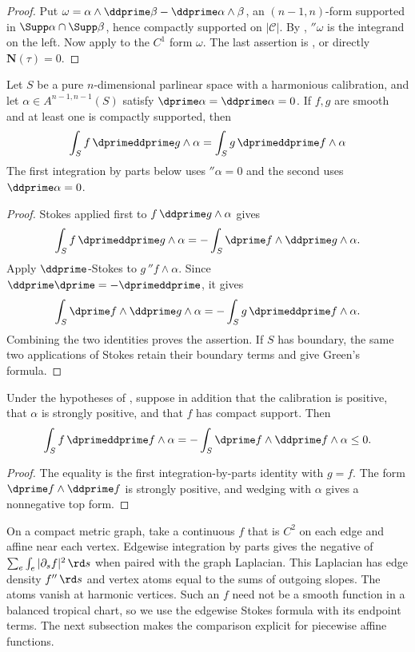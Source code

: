 \begin{proof}
Put $\omega=\alpha\wedge\ddprime\beta-\ddprime\alpha\wedge\beta$, an
$(n-1,n)$-form supported in $\Supp\alpha\cap\Supp\beta$, hence compactly
supported on $|\mathscr C|$.  By ,
$\dprime\omega$ is the integrand on the left.  Now apply
 to the $C^1$ form $\omega$.  The last
assertion is
, or directly $\mathbf N(\tau)=0$.
\end{proof}

\begin{corollary}
\label{cor:ch11-green-symmetry}
Let $S$ be a pure $n$-dimensional parlinear space with a harmonious
calibration, and let $\alpha\in A^{n-1,n-1}(S)$ satisfy
$\dprime\alpha=\ddprime\alpha=0$.  If $f,g$ are smooth and at least one is
compactly supported, then
\[
\int_S f\,\dprimeddprime g\wedge\alpha
=\int_S g\,\dprimeddprime f\wedge\alpha
\]
The first integration by parts below uses $\dprime\alpha=0$ and the second
uses $\ddprime\alpha=0$.
\end{corollary}
\begin{proof}
Stokes applied first to $f\,\ddprime g\wedge\alpha$ gives
\[
 \int_S f\,\dprimeddprime g\wedge\alpha
 =-\int_S \dprime f\wedge \ddprime g\wedge\alpha.
\]
Apply $\ddprime$-Stokes to $g\,\dprime f\wedge\alpha$.  Since
$\ddprime\dprime=-\dprimeddprime$, it gives
\[
 \int_S \dprime f\wedge \ddprime g\wedge\alpha
 =-\int_S g\,\dprimeddprime f\wedge\alpha.
\]
Combining the two identities proves the assertion. If $S$ has boundary, the
same two applications of Stokes retain their boundary terms and give Green's
formula.
\end{proof}

\begin{corollary}
\label{cor:tropical-dirichlet-sign}
Under the hypotheses of , suppose in addition
that the calibration is positive, that $\alpha$ is strongly positive, and
that $f$ has compact support. Then
\[
 \int_S f\,\dprimeddprime f\wedge\alpha
 =-\int_S\dprime f\wedge\ddprime f\wedge\alpha\leq0.
\]
\end{corollary}
\begin{proof}
The equality is the first integration-by-parts identity with $g=f$.  The
form $\dprime f\wedge\ddprime f$ is strongly positive, and wedging with
$\alpha$ gives a nonnegative top form.
\end{proof}

\begin{example}
\label{ex:ch11-graph-energy}
On a compact metric graph, take a continuous $f$ that is $C^2$ on each
edge and affine near each vertex.  Edgewise integration by parts gives
the negative of $\sum_e\int_e|\partial_s f|^2\,\rd s$ when paired with
the graph Laplacian.  This Laplacian has edge density $f''\,\rd s$ and
vertex atoms equal to the sums of outgoing slopes.  The atoms vanish
at harmonic vertices.  Such an $f$ need not be a smooth function in a
balanced tropical chart, so we use the edgewise Stokes formula with its
endpoint terms.  The next subsection makes the comparison explicit for
piecewise affine functions.
\end{example}

